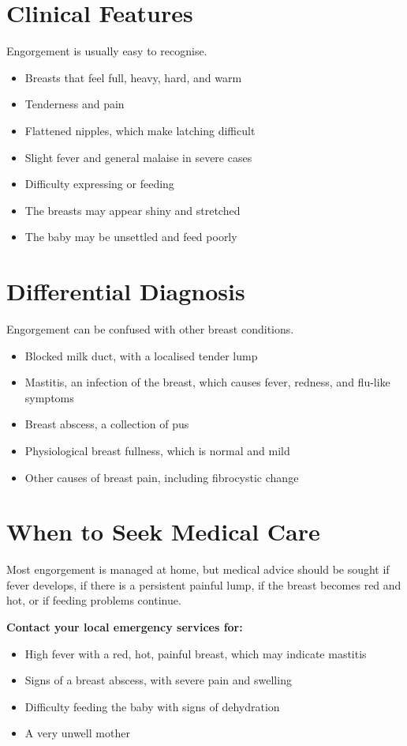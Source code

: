 \section*{Clinical Features}
Engorgement is usually easy to recognise.
\begin{itemize}
    \item Breasts that feel full, heavy, hard, and warm
    \item Tenderness and pain
    \item Flattened nipples, which make latching difficult
    \item Slight fever and general malaise in severe cases
    \item Difficulty expressing or feeding
    \item The breasts may appear shiny and stretched
    \item The baby may be unsettled and feed poorly
\end{itemize}

\section*{Differential Diagnosis}
Engorgement can be confused with other breast conditions.
\begin{itemize}
    \item Blocked milk duct, with a localised tender lump
    \item Mastitis, an infection of the breast, which causes fever, redness, and flu-like symptoms
    \item Breast abscess, a collection of pus
    \item Physiological breast fullness, which is normal and mild
    \item Other causes of breast pain, including fibrocystic change
\end{itemize}

\section*{When to Seek Medical Care}
Most engorgement is managed at home, but medical advice should be sought if fever develops, if there is a persistent painful lump, if the breast becomes red and hot, or if feeding problems continue.

\textbf{Contact your local emergency services for:}
\begin{itemize}
    \item High fever with a red, hot, painful breast, which may indicate mastitis
    \item Signs of a breast abscess, with severe pain and swelling
    \item Difficulty feeding the baby with signs of dehydration
    \item A very unwell mother
\end{itemize}

